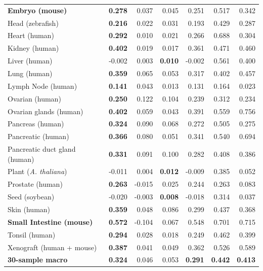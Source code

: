 \documentclass[10pt]{article}
\begin{document}
\begin{center}
\begin{tabular*}{\linewidth}{@{\extracolsep{\fill}}lrrrrrr@{}}
\textbf{Embryo (mouse)} & \textbf{0.278} & 0.037 & 0.045 & 0.251 & 0.517 & 0.342 \\
Head (zebrafish) & \textbf{0.216} & 0.022 & 0.031 & 0.193 & 0.429 & 0.287 \\
Heart (human) & \textbf{0.292} & 0.010 & 0.021 & 0.266 & 0.688 & 0.304 \\
Kidney (human) & \textbf{0.402} & 0.019 & 0.017 & 0.361 & 0.471 & 0.460 \\
Liver (human) & -0.002 & 0.003 & \textbf{0.010} & -0.002 & 0.561 & 0.400 \\
Lung (human) & \textbf{0.359} & 0.065 & 0.053 & 0.317 & 0.402 & 0.457 \\
Lymph Node (human) & \textbf{0.141} & 0.043 & 0.013 & 0.131 & 0.164 & 0.023 \\
Ovarian (human) & \textbf{0.250} & 0.122 & 0.104 & 0.239 & 0.312 & 0.234 \\
Ovarian glands (human) & \textbf{0.402} & 0.059 & 0.043 & 0.391 & 0.559 & 0.756 \\
Pancreas (human) & \textbf{0.324} & 0.090 & 0.068 & 0.272 & 0.505 & 0.275 \\
Pancreatic (human) & \textbf{0.366} & 0.080 & 0.051 & 0.341 & 0.540 & 0.694 \\
Pancreatic duct gland (human) & \textbf{0.331} & 0.091 & 0.100 & 0.282 & 0.408 & 0.386 \\
Plant (\textit{A. thaliana}) & -0.011 & 0.004 & \textbf{0.012} & -0.009 & 0.385 & 0.052 \\
Prostate (human) & \textbf{0.263} & -0.015 & 0.025 & 0.244 & 0.263 & 0.083 \\
Seed (soybean) & -0.020 & -0.003 & \textbf{0.008} & -0.018 & 0.314 & 0.037 \\
Skin (human) & \textbf{0.359} & 0.048 & 0.086 & 0.299 & 0.437 & 0.368 \\
\textbf{Small Intestine (mouse)} & \textbf{0.572} & -0.104 & 0.067 & 0.548 & 0.701 & 0.715 \\
Tonsil (human) & \textbf{0.294} & 0.028 & 0.018 & 0.249 & 0.462 & 0.399 \\
Xenograft (human + mouse) & \textbf{0.387} & 0.041 & 0.049 & 0.362 & 0.526 & 0.589 \\
\midrule
\textbf{30-sample macro} & \textbf{0.324} & 0.046 & 0.053 &
\textbf{0.291} & \textbf{0.442} & \textbf{0.413} \\
\bottomrule
\end{tabular*}

\endgroup
\end{center}
\par\smallskip
\end{document}
